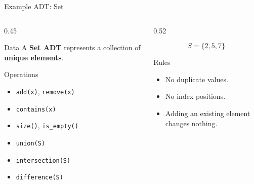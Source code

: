 \documentclass[aspectratio=169]{beamer}
\begin{document}
\begin{frame}{Example ADT: Set}
\footnotesize
\begin{columns}[T]
\begin{column}{0.45\textwidth}
\begin{block}{Data}
A \textbf{Set ADT} represents a collection of \textbf{unique elements}.
\end{block}

\begin{exampleblock}{Operations}
\begin{itemize}
  \item \texttt{add(x)}, \texttt{remove(x)}
  \item \texttt{contains(x)}
  \item \texttt{size()}, \texttt{is\_empty()}
  \item \texttt{union(S)}
  \item \texttt{intersection(S)}
  \item \texttt{difference(S)}
\end{itemize}
\end{exampleblock}
\end{column}

\begin{column}{0.52\textwidth}
\begin{center}

\vspace{-0.2em}
\[
S=\{2,5,7\}
\]
\end{center}

\begin{alertblock}{Rules}
\begin{itemize}
  \item No duplicate values.
  \item No index positions.
  \item Adding an existing element changes nothing.
\end{itemize}
\end{alertblock}
\end{column}
\end{columns}
\end{frame}
\end{document}
